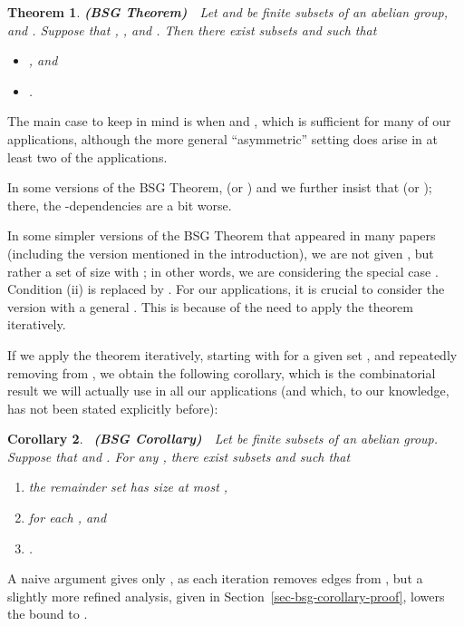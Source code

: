 \documentclass[11pt]{article}
\newcommand{\LONG}[1]{#1}\newcommand{\SHORT}[1]{}
\newtheorem{theorem}{Theorem}[section]
\newtheorem{corollary}[theorem]{Corollary}
\begin{document}
\begin{theorem} {\bf(BSG Theorem)}\ \ Let  and  be finite subsets of an abelian group, and .
  Suppose that , , and .
  Then there exist subsets  and  such that

\begin{itemize}
\item[\rm (i)]   , and
\item[\rm (ii)]  .
\end{itemize}
\end{theorem}

The main case to keep in mind is when  and ,
which is sufficient for many of our applications, although the
more general ``asymmetric'' setting does arise in at least two of the
applications.

In some versions of the BSG Theorem,
 (or ) and we further insist that  (or ); there, the -dependencies are a bit worse.

In some simpler versions of the BSG Theorem that appeared in many papers (including the version mentioned in the introduction), we are not given ,
but rather a set  of size  with ; in other words, we are considering the special case .  Condition (ii) is replaced by
.
For our applications, it is crucial to consider the version with
a general .  This is because of the need to apply the
theorem iteratively.

If we apply the theorem iteratively, starting with
 for a given set , and repeatedly removing
 from , we obtain the following corollary, which
is the combinatorial result we will actually use in all our applications
(and which, to our knowledge, has not been stated explicitly before):

\begin{corollary}~\label{cor-BSG} {\bf(BSG Corollary)}\ \
Let  be finite subsets of an abelian group.
  Suppose that  and .  For any , there exist subsets
   and  such that

\begin{enumerate}
\item[\rm (i)]
the \emph{remainder set}  has
size at most ,
\item[\rm (ii)]
   for each , and
\item[\rm (iii)] .
\end{enumerate}
\end{corollary}

A naive argument gives only , as each
iteration removes  edges from ,
but a slightly more refined analysis, given
in \LONG{Section~\ref{sec-bsg-corollary-proof}}\SHORT{the full paper}, lowers
the bound to .
\end{document}
